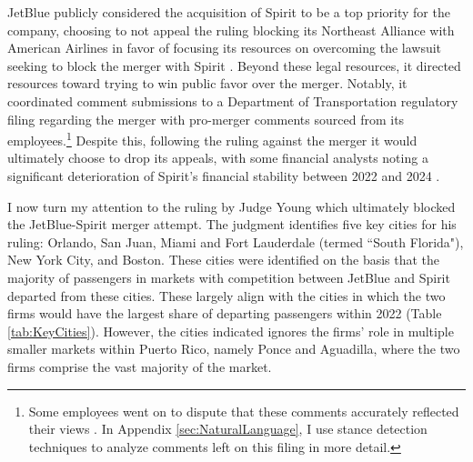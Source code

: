 \documentclass{article}
\begin{document}
	JetBlue publicly considered the acquisition of Spirit to be a top priority for the company, choosing to not appeal the ruling blocking its Northeast Alliance with American Airlines in favor of focusing its resources on overcoming the lawsuit seeking to block the merger with Spirit \citep{aratani_jetblue_2023}. Beyond these legal resources, it directed resources toward trying to win public favor over the merger. Notably, it coordinated comment submissions to a Department of Transportation regulatory filing regarding the merger with pro-merger comments sourced from its employees.\footnote{Some employees went on to dispute that these comments accurately reflected their views \citep{birnbaum_elizabeth_2023, birnbaum_jet-blue_2023}. In Appendix \ref{sec:NaturalLanguage}, I use stance detection techniques to analyze comments left on this filing in more detail.} Despite this, following the ruling against the merger it would ultimately choose to drop its appeals, with some financial analysts noting a significant deterioration of Spirit's financial stability between 2022 and 2024 \citep{sider_jetblue_2024}. 
	
	I now turn my attention to the ruling by Judge Young which ultimately blocked the JetBlue-Spirit merger attempt. The judgment identifies five key cities for his ruling: Orlando, San Juan, Miami and Fort Lauderdale (termed ``South Florida"), New York City, and Boston. These cities were identified on the basis that the majority of passengers in markets with competition between JetBlue and Spirit departed from these cities. These largely align with the cities in which the two firms would have the largest share of departing passengers within 2022 (Table \ref{tab:KeyCities}). However, the cities indicated ignores the firms' role in multiple smaller markets within Puerto Rico, namely Ponce and Aguadilla, where the two firms comprise the vast majority of the market. 
	
\end{document}
